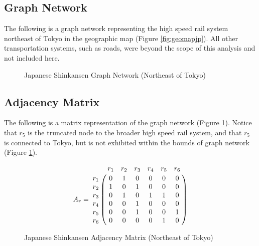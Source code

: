 \documentclass{article}
\begin{document}
\newpage
\subsection*{Graph Network}
The following is a graph network representing the high speed rail system northeast of Tokyo in the geographic map (Figure \ref{fig:geomapjp}). All other transportation systems, such as roads, were beyond the scope of this analysis and not included here.
    \begin{figure}[h]
    \centering
    \caption{Japanese Shinkansen Graph Network (Northeast of Tokyo)}
    \label{fig:graphjp}
    \end{figure}

\subsection*{Adjacency Matrix}
The following is a matrix representation of the graph network (Figure \ref{fig:graphjp}). Notice that $r_5$ is the truncated node to the broader high speed rail system, and that $r_5$ is connected to Tokyo, but is not exhibited within the bounds of graph network (Figure \ref{fig:graphjp}).

    \begin{figure}[h]
    \begin{equation}
        A_r = \bordermatrix{
                 & r_1 & r_2 & r_3 & r_4 & r_5 & r_6 \cr
             r_1 &   0   & 1   & 0   & 0   & 0   & 0 \cr
             r_2 &   1   & 0   & 1   & 0   & 0   & 0 \cr
             r_3 &   0   & 1   & 0   & 1   & 1   & 0 \cr
             r_4 &   0   & 0   & 1   & 0   & 0   & 0 \cr
             r_5 &   0   & 0   & 1   & 0   & 0   & 1 \cr
             r_6 &   0   & 0   & 0   & 0   & 1   & 0 \cr
        }
    \end{equation}
    \caption{Japanese Shinkansen Adjacency Matrix (Northeast of Tokyo)}
    \label{fig:matrixjp}
    \end{figure}
\end{document}
